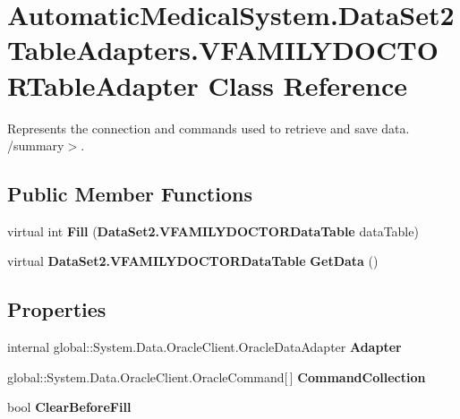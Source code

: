 \section{AutomaticMedicalSystem.DataSet2TableAdapters.VFAMILYDOCTORTableAdapter Class Reference}
\label{class_automatic_medical_system_1_1_data_set2_table_adapters_1_1_v_f_a_m_i_l_y_d_o_c_t_o_r_table_adapter}
Represents the connection and commands used to retrieve and save data. /summary$>$.  


\subsection*{Public Member Functions}
\begin{CompactItemize}
\item 
virtual int \textbf{Fill} ({\bf DataSet2.VFAMILYDOCTORDataTable} dataTable)\label{class_automatic_medical_system_1_1_data_set2_table_adapters_1_1_v_f_a_m_i_l_y_d_o_c_t_o_r_table_adapter_15f8827da46925e8e62c82848b645279}

\item 
virtual {\bf DataSet2.VFAMILYDOCTORDataTable} \textbf{GetData} ()\label{class_automatic_medical_system_1_1_data_set2_table_adapters_1_1_v_f_a_m_i_l_y_d_o_c_t_o_r_table_adapter_37a7e4260ac960bf770c0551dda198aa}

\end{CompactItemize}
\subsection*{Properties}
\begin{CompactItemize}
\item 
internal global::System.Data.OracleClient.OracleDataAdapter \textbf{Adapter}\hspace{0.3cm}{\tt  [get]}\label{class_automatic_medical_system_1_1_data_set2_table_adapters_1_1_v_f_a_m_i_l_y_d_o_c_t_o_r_table_adapter_f5187dc8957e80f0843bffc0c3790159}

\item 
global::System.Data.OracleClient.OracleCommand[$\,$] \textbf{CommandCollection}\hspace{0.3cm}{\tt  [get]}\label{class_automatic_medical_system_1_1_data_set2_table_adapters_1_1_v_f_a_m_i_l_y_d_o_c_t_o_r_table_adapter_9b35e3ecac5052fcc78ff205946f3d79}

\item 
bool \textbf{ClearBeforeFill}\hspace{0.3cm}{\tt  [get, set]}\label{class_automatic_medical_system_1_1_data_set2_table_adapters_1_1_v_f_a_m_i_l_y_d_o_c_t_o_r_table_adapter_65e6a56ffb4c64fe6aa29606531386f2}

\end{CompactItemize}


